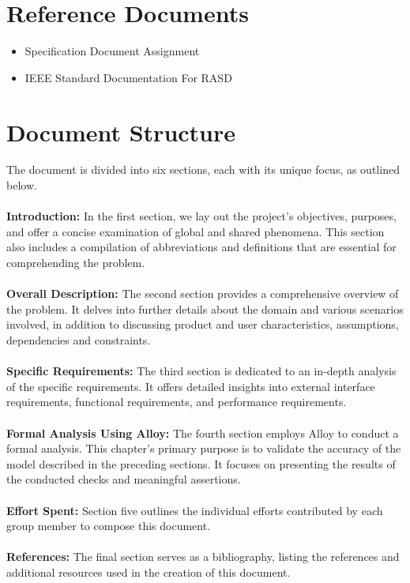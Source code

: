 \section{Reference Documents}
\label{sec:reference_documents}%
\begin{itemize}
    \item Specification Document Assignment
    \item IEEE Standard Documentation For RASD 
\end{itemize}


\section{Document Structure}
\label{sec:document_structure}%
\noindent The document is divided into six sections, each with its unique focus, as outlined below.\\\\
\textbf{Introduction:} In the first section, we lay out the project's objectives, purposes, and offer a concise examination of global and shared phenomena. This section also includes a compilation of abbreviations and definitions that are essential for comprehending the problem.\\\\
\textbf{Overall Description:} The second section provides a comprehensive overview of the problem. It delves into further details about the domain and various scenarios involved, in addition to discussing product and user characteristics, assumptions, dependencies and constraints.\\\\
\textbf{Specific Requirements:} The third section is dedicated to an in-depth analysis of the specific requirements. It offers detailed insights into external interface requirements, functional requirements, and performance requirements.\\\\
\textbf{Formal Analysis Using Alloy:} The fourth section employs Alloy to conduct a formal analysis. This chapter's primary purpose is to validate the accuracy of the model described in the preceding sections. It focuses on presenting the results of the conducted checks and meaningful assertions.\\\\
\textbf{Effort Spent:} Section five outlines the individual efforts contributed by each group member to compose this document.\\\\
\textbf{References:} The final section serves as a bibliography, listing the references and additional resources used in the creation of this document.

